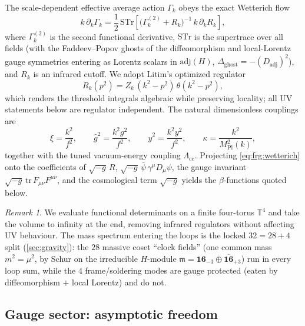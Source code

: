 \documentclass[11pt]{article}
\theoremstyle{plain}
\theoremstyle{definition}
\theoremstyle{remark}
\newtheorem{remark}[theorem]{Remark}
\begin{document}
The scale-dependent effective average action $\Gamma_{k}$ obeys the exact
Wetterich flow
\begin{equation}\label{eq:frg:wetterich}
  k\,\partial_{k}\Gamma_{k}
  =\frac12\,\mathrm{STr}\!\left[
    \bigl(\Gamma_{k}^{(2)}+R_{k}\bigr)^{-1}\,k\,\partial_{k}R_{k}\right],
\end{equation}
where $\Gamma_{k}^{(2)}$ is the second functional derivative, $\mathrm{STr}$
is the supertrace over all fields (with the Faddeev--Popov ghosts of the
diffeomorphism and local-Lorentz gauge symmetries entering as Lorentz
scalars in $\mathrm{adj}(H)$, $\Delta_{\mathrm{ghost}}=-(D_{\mathrm{adj}})^{2}$),
and $R_{k}$ is an infrared cutoff. We adopt Litim's optimized regulator
\begin{equation}\label{eq:frg:litim}
  R_{k}(p^{2})=Z_{k}\,(k^{2}-p^{2})\,\theta(k^{2}-p^{2}),
\end{equation}
which renders the threshold integrals algebraic while preserving locality;
all UV statements below are regulator independent. The natural
dimensionless couplings are
\begin{equation}\label{eq:frg:couplings}
  \xi=\frac{k^{2}}{f^{2}},\qquad
  \hat g^{2}=\frac{k^{2}g^{2}}{f^{2}},\qquad
  \hat y^{2}=\frac{k^{2}y^{2}}{f^{2}},\qquad
  \kappa=\frac{k^{2}}{M_{\mathrm{Pl}}^{2}(k)},
\end{equation}
together with the tuned vacuum-energy coupling $\Lambda_{\mathrm{cc}}$.
Projecting \eqref{eq:frg:wetterich} onto the coefficients of
$\sqrt{-g}\,R$, $\sqrt{-g}\,\bar\psi\,\gamma^{\mu}D_{\mu}\psi$, the gauge
invariant $\sqrt{-g}\,\mathrm{tr}\,F_{\mu\nu}F^{\mu\nu}$, and the cosmological
term $\sqrt{-g}$ yields the $\beta$-functions quoted below.

\begin{remark}
We evaluate functional determinants on a finite four-torus $\mathbb{T}^{4}$
and take the volume to infinity at the end, removing infrared regulators
without affecting UV behaviour. The mass spectrum entering the loops is the
locked $32=28+4$ split (\autoref{sec:gravity}): the $28$ massive coset
``clock fields'' (one common mass $m^{2}=\mu^{2}$, by Schur on the
irreducible $H$-module $\mathfrak{m}=\mathbf{16}_{-3}\oplus\overline{\mathbf{16}}_{+3}$)
run in every loop sum, while the $4$ frame/soldering modes are gauge
protected (eaten by diffeomorphism $+$ local Lorentz) and do not.
\end{remark}

\subsection{Gauge sector: asymptotic freedom}
\label{sec:frg:gauge}
\end{document}
